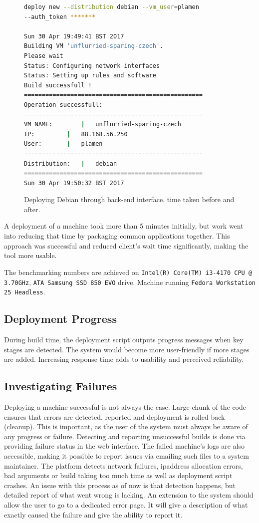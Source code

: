 \documentclass{article}
\begin{document}
\begin{figure}
\begin{lstlisting}[frame=single, language=Bash]
deploy new --distribution debian --vm_user=plamen
--auth_token *******

Sun 30 Apr 19:49:41 BST 2017
Building VM 'unflurried-sparing-czech'.
Please wait
Status: Configuring network interfaces
Status: Setting up rules and software
Build successfull !
==================================================
Operation successfull:
--------------------------------------------------
VM NAME:		|	unflurried-sparing-czech
IP:			|	88.168.56.250
User:		|	plamen
--------------------------------------------------
Distribution:	|	debian
==================================================
Sun 30 Apr 19:50:32 BST 2017
\end{lstlisting}
\caption{Deploying Debian through back-end interface, time taken before and after.}
\label{fig:deeploy-debian-output}
\end{figure}

A deployment of a machine took more than 5 minutes initially, but work went into reducing that time by packaging common applications together. This approach was successful and reduced client's wait time significantly, making the tool more usable.

The benchmarking numbers are achieved on \texttt{Intel(R) Core(TM) i3-4170 CPU @ 3.70GHz}, \texttt{ATA Samsung SSD 850 EVO} drive. Machine running \texttt{Fedora Workstation 25 Headless}.

\subsection{Deployment Progress}
During build time, the deployment script outputs progress messages when key stages are detected. The system would become more user-friendly if more stages are added. Increasing response time adds to usability and perceived reliability.

\subsection{Investigating Failures}
Deploying a machine successful is not always the case. Large chunk of the code ensures that errors are detected, reported and deployment is rolled back (cleanup). This is important, as the user of the system must always be aware of any progress or failure.
Detecting and reporting unsuccessful builds is done via providing failure status in the web interface. The failed machine's logs are also accessible, making it possible to report issues via emailing such files to a system maintainer. The platform detects network failures, \gls{ipaddress} allocation errors, bad arguments or build taking too much time as well as deployment script crashes.
An issue with this process as of now is that detection happens, but detailed report of what went wrong is lacking. An extension to the system should allow the user to go to a dedicated error page. It will give a description of what exactly caused the failure and give the ability to report it.
\end{document}
